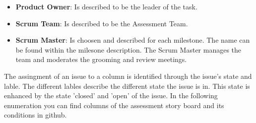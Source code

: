 \documentclass[openetcs]{template/openetcs_article}
\begin{document}
\begin{itemize}
\item \textbf{Product Owner}: Is described to be the leader of the task.
\item \textbf{Scrum Team}: Is described to be the Assessment Team.
\item \textbf{Scrum Master}: Is choosen and described for each milestone. The name can be found within the milesone description. The Scrum Master manages the team and moderates the grooming and review meetings.
\end{itemize}

The assingment of an issue to a column is identified through the issue's state and lable. The different lables describe the different state the issue is in. This state is enhanced by the state 'closed' and 'open' of the issue.  In the following enumeration you can find columns of the  assessment story board and its conditions in github.
\end{document}

